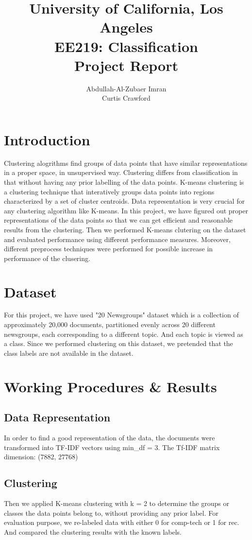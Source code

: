 \documentclass{report}
\author{Abdullah-Al-Zubaer Imran\\Curtis Crawford}
\title{University of California, Los Angeles \\
		{\large EE219: \textbf{Classification} \\ Project Report} }
\date{}
\begin{document}
\maketitle

\section*{Introduction}
Clustering alogrithms find groups of data points that have similar representations in a proper space, in unsupervised way. Clustering differs from classification in that without having any prior labelling of the data points. K-means clustering is a clustering technique that interatively groups data points into regions characterized by a set of cluster centroids. Data representation is very crucial for any clustering algorithm like K-means. In this project, we have figured out proper representations of the data points so that we can get efficient and reasonable results from the clustering. Then we performed K-means clutering on the dataset and evaluated performance using different performance measures. Moreover, different preprocess techniques were performed for possible increase in performance of the clusering. 

\section*{Dataset}
For this project, we have used "20 Newsgroups" dataset which is a collection of approximately 20,000 documents, partitioned evenly across 20 different newsgroups, each corresponding to a different topic. And each topic is viewed as a class. Since we performed clustering on this dataset, we pretended that the class labels are not available in the dataset. 



\section*{Working Procedures \& Results}

\subsection*{Data Representation}
In order to find a good representation of the data, the documents were transformed into TF\--IDF vectors using min\_df = 3.
The Tf\--IDF matrix dimension: (7882, 27768)   \\

\subsection*{Clustering}
Then we applied K-means clustering with k = 2 to determine the groups or classes the data points belong to, without providing any prior label. For evaluation purpose, we re-labeled data with either 0 for comp-tech or 1 for rec. And compared the clustering results with the known labels. \\ 
\end{document}
